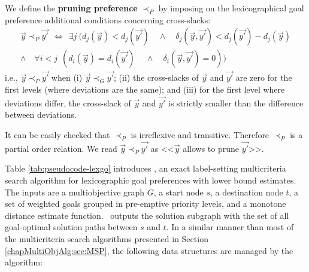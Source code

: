 \begin{defi}\label{chapMultiObjAlg:pruningpreference}
We define the \textbf{pruning preference} $\prec_{P}$ by imposing on the lexicographical goal preference additional conditions concerning cross-slacks: 
    \begin{multline}\label{eq:cond-prune-new}
      \vec{y} \prec_{P} \vec{y'} \ \ \Leftrightarrow \ \ \exists j
      \ (d_j(\vec{y}) < d_j(\vec{y'}) \quad \land  \quad \delta_j(\vec{y}, \vec
      {y'}) < d_j(\vec{y'}) - d_j(\vec{y})    \\ \land      \quad \forall i < j
      \ \ (d_i(\vec{y}) = d_i(\vec{y'}) \ \quad \land \quad \delta_i(\vec{y}, \vec{y'}) = 0))
    \end{multline}
i.e., $\vec{y} \prec_{P} \vec{y'}$ when (i) $\vec{y} \prec_{G} \vec{y'}$;
(ii) the cross-slacks of  $\vec{y}$ and  $\vec{y'}$ are zero for the first levels (where deviations are the same); and (iii) for the first level where deviations differ, the cross-slack of $\vec{y}$ and $\vec{y'}$ is strictly smaller than the difference between deviations. 

It can be easily checked that $\prec_{P}$ is irreflexive and  transitive. Therefore $\prec_{P}$ is a partial order relation. We read $\vec{y} \prec_{P} \vec{y'}$ as <<$\vec y$ allows to prune $\vec{y'}$>>.
\end{defi}

Table \ref{tab:pseudocode-lexgo} introduces \lexgo, an exact label-setting multicriteria search algorithm for lexicographic goal preferences with lower bound estimates. The inputs are a multiobjective graph $G$, a start node $s$, a destination node $t$, a set of weighted goals grouped in pre-emptive priority levels, and a monotone distance estimate function. \lexgo \ outputs the solution subgraph with the set of all goal-optimal solution paths between $s$ and $t$. In a similar manner than most of the multicriteria search algorithms presented in Section \ref{chapMultiObjAlg:sec:MSP}, the following data structures are managed by the algorithm:

